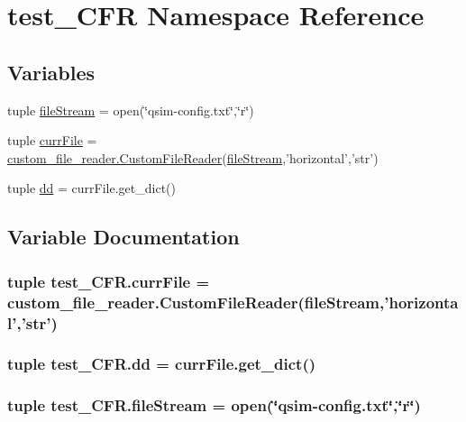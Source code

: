 \hypertarget{namespacetest___c_f_r}{\section{test\-\_\-\-C\-F\-R Namespace Reference}
\label{namespacetest___c_f_r}
}
\subsection*{Variables}
\begin{DoxyCompactItemize}
\item 
tuple \hyperlink{namespacetest___c_f_r_a2788cbd1c3e51006f7adc65ba92ac4db}{file\-Stream} = open(\char`\"{}qsim-\/config.\-txt\char`\"{},\char`\"{}r\char`\"{})
\item 
tuple \hyperlink{namespacetest___c_f_r_abc1c0f00adf65dd018a7d9ede57946d0}{curr\-File} = \hyperlink{classcustom__file__reader_1_1_custom_file_reader}{custom\-\_\-file\-\_\-reader.\-Custom\-File\-Reader}(\hyperlink{namespacetest___c_f_r_a2788cbd1c3e51006f7adc65ba92ac4db}{file\-Stream},'horizontal','str')
\item 
tuple \hyperlink{namespacetest___c_f_r_ad4fc1ef0fa68ca6720f5ec10f7e26974}{dd} = curr\-File.\-get\-\_\-dict()
\end{DoxyCompactItemize}


\subsection{Variable Documentation}
\hypertarget{namespacetest___c_f_r_abc1c0f00adf65dd018a7d9ede57946d0}{
\subsubsection[{curr\-File}]{\setlength{\rightskip}{0pt plus 5cm}tuple test\-\_\-\-C\-F\-R.\-curr\-File = {\bf custom\-\_\-file\-\_\-reader.\-Custom\-File\-Reader}({\bf file\-Stream},'horizontal','str')}}\label{namespacetest___c_f_r_abc1c0f00adf65dd018a7d9ede57946d0}
\hypertarget{namespacetest___c_f_r_ad4fc1ef0fa68ca6720f5ec10f7e26974}{
\subsubsection[{dd}]{\setlength{\rightskip}{0pt plus 5cm}tuple test\-\_\-\-C\-F\-R.\-dd = curr\-File.\-get\-\_\-dict()}}\label{namespacetest___c_f_r_ad4fc1ef0fa68ca6720f5ec10f7e26974}
\hypertarget{namespacetest___c_f_r_a2788cbd1c3e51006f7adc65ba92ac4db}{
\subsubsection[{file\-Stream}]{\setlength{\rightskip}{0pt plus 5cm}tuple test\-\_\-\-C\-F\-R.\-file\-Stream = open(\char`\"{}qsim-\/config.\-txt\char`\"{},\char`\"{}r\char`\"{})}}\label{namespacetest___c_f_r_a2788cbd1c3e51006f7adc65ba92ac4db}
